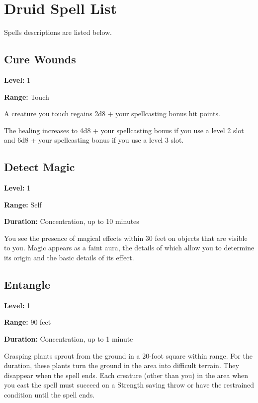 \documentclass[12pt,letterpaper,twocolumn,openany,nodeprecatedcode,bg=none]{dndbook}
\let\oldsubsection\subsection
\renewcommand{\subsection}[1]{%
  \needspace{5\baselineskip}%
  \oldsubsection{#1}%
}
\begin{document}
\newpage

\section{Druid Spell List}\label{druid-spell-list}

Spells descriptions are listed below.

\subsection{Cure Wounds}\label{cure-wounds}

\textbf{Level:} 1

\textbf{Range:} Touch

A creature you touch regains 2d8 + your spellcasting bonus hit points.

The healing increases to 4d8 + your spellcasting bonus if you use a
level 2 slot and 6d8 + your spellcasting bonus if you use a level 3
slot.

\subsection{Detect Magic}\label{detect-magic}

\textbf{Level:} 1

\textbf{Range:} Self

\textbf{Duration:} Concentration, up to 10 minutes

You see the presence of magical effects within 30 feet on objects that
are visible to you. Magic appears as a faint aura, the details of which
allow you to determine its origin and the basic details of its effect.

\subsection{Entangle}\label{entangle}

\textbf{Level:} 1

\textbf{Range:} 90 feet

\textbf{Duration:} Concentration, up to 1 minute

Grasping plants sprout from the ground in a 20-foot square within range.
For the duration, these plants turn the ground in the area into
difficult terrain. They disappear when the spell ends. Each creature
(other than you) in the area when you cast the spell must succeed on a
Strength saving throw or have the restrained condition until the spell
ends.
\end{document}
